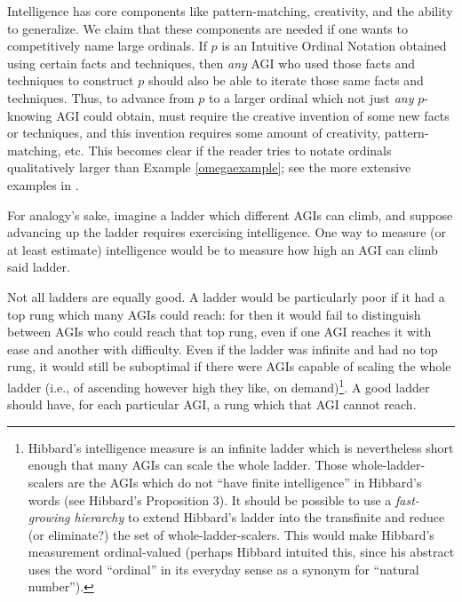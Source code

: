 \documentclass[runningheads]{llncs}
\begin{document}
Intelligence has core components like pattern-matching,
creativity, and the ability to generalize.
We claim that these components are needed if one wants to
competitively name large ordinals. If $p$ is an Intuitive Ordinal Notation
obtained using certain facts and techniques, then \emph{any} AGI who used those
facts and techniques to construct $p$ should also be able to iterate those same
facts and techniques.
Thus, to advance from
$p$ to a larger ordinal which not just \emph{any} $p$-knowing
AGI could obtain, must require
the creative invention of some new facts or techniques, and
this invention requires some amount of creativity,
pattern-matching, etc. This becomes clear if the reader tries to
notate ordinals qualitatively larger than Example \ref{omegaexample};
see the more extensive examples in \cite{github}.

For analogy's sake, imagine a ladder which different AGIs
can climb, and suppose advancing up the ladder requires exercising
intelligence. One way to measure (or at least estimate) intelligence would be
to measure how high an AGI can climb said ladder.

Not all ladders are equally good. A ladder would be particularly poor if it had
a top rung which many AGIs could reach: for then it would fail to
distinguish between AGIs who could reach that top rung, even if one
AGI reaches it with ease and another with difficulty.
Even if the ladder was infinite and had no top rung, it would still be suboptimal
if there were AGIs capable of scaling the whole
ladder (i.e., of ascending however high they like, on demand)\footnote{Hibbard's
intelligence measure
\cite{hibbard2011measuring} is an infinite ladder
which is nevertheless short enough that many AGIs can
scale the whole ladder. Those whole-ladder-scalers are the AGIs which
do not ``have finite intelligence'' in Hibbard's words
(see Hibbard's Proposition 3). It should be possible to
use a \emph{fast-growing hierarchy}
\cite{fairtlough1998hierarchies} \cite{weiermann2002slow}
to extend Hibbard's ladder into the transfinite and reduce (or eliminate?)
the set of whole-ladder-scalers. This would make
Hibbard's measurement ordinal-valued
(perhaps Hibbard intuited this, since his abstract uses the
word ``ordinal''
in its everyday sense as a synonym for ``natural number'').}.
A good ladder should have, for each particular AGI, a rung which that
AGI cannot reach.
\end{document}
